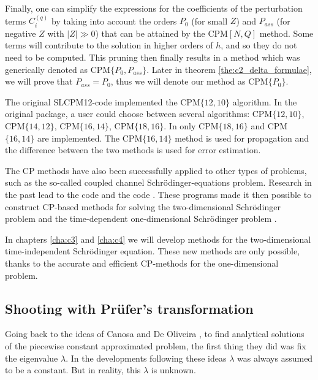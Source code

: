 Finally, one can simplify the expressions for the coefficients of the perturbation terms $C^{(q)}_i$ by taking into account the orders $P_0$ (for small $Z$) and $P_{ass}$ (for negative $Z$ with $|Z| \gg 0$) that can be attained by the CPM$[N,Q]$ method. Some terms will contribute to the solution in higher orders of $h$, and so they do not need to be computed. This pruning then finally results in a method which was generically denoted as CPM$\{P_0, P_{ass}\}$. Later in theorem \ref{the:c2_delta_formulae}, we will prove that $P_{ass} = P_0$, thus we will denote our method as CPM$\{P_0\}$.

The original SLCPM12-code implemented the CPM$\{12,10\}$ algorithm. In the original \matslise{} package, a user could choose between several algorithms: CPM$\{12,10\}$, CPM$\{14,12\}$, CPM$\{16,14\}$, CPM$\{18,16\}$.
In  only CPM$\{18,16\}$ and CPM$\{16,14\}$ are implemented. The CPM$\{16,14\}$ method is used for propagation and the difference between the two methods is used for error estimation.

The CP methods have also been successfully applied to other types of problems, such as the so-called coupled channel Schrödinger-equations problem. Research in the past lead to the \fortran{} code \lilix{} \cite{ixaru_lilix_2002} and the \matlab{} code \matscs{} \cite{ledoux_numerical_2007}. These programs made it then possible to construct CP-based methods for solving the two-dimensional Schrödinger problem \cite{ixaru_new_2010} and the time-dependent one-dimensional Schrödinger problem \cite{ledoux_accurate_2014}.

In chapters \ref{cha:c3} and \ref{cha:c4} we will develop methods for the two-dimensional time-independent Schrödinger equation. These new methods are only possible, thanks to the accurate and efficient CP-methods for the one-dimensional problem.

\subsection{Shooting with Prüfer's transformation}\label{sec:c2_shooting_prufer}

Going back to the ideas of Canosa and De Oliveira \cite{canosa_new_1970}, to find analytical solutions of the piecewise constant approximated problem, the first thing they did was fix the eigenvalue $\lambda$. In the developments following these ideas $\lambda$ was always assumed to be a constant. But in reality, this $\lambda$ is unknown.

